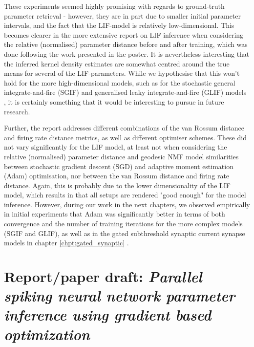 \documentclass[mphil,deptreport,ianc]{infthesis} %
\begin{document}
These experiments seemed highly promising with regards to ground-truth parameter retrieval - however, they are in part due to smaller initial parameter intervals, and the fact that the LIF-model is relatively low-dimensional.
This becomes clearer in the more extensive report on LIF inference when considering the relative (normalised) parameter distance before and after training, which was done following the work presented in the poster.
It is nevertheless interesting that the inferred kernel density estimates are somewhat centred around the true means for several of the LIF-parameters.
While we hypothesise that this won't hold for the more high-dimensional models, such as for the stochastic general integrate-and-fire (SGIF) \cite{Rene2020} and generalised leaky integrate-and-fire (GLIF) models \cite{allen_glif_white_paper}, it is certainly something that it would be interesting to pursue in future research.

Further, the report addresses different combinations of the van Rossum distance and firing rate distance metrics, as well as different optimiser schemes.
These did not vary significantly for the LIF model, at least not when considering the relative (normalised) parameter distance and geodesic NMF model similarities between stochastic gradient descent (SGD) and adaptive moment estimation (Adam) optimisation, nor between the van Rossum distance and firing rate distance.
Again, this is probably due to the lower dimensionality of the LIF model, which results in that all setups are rendered "good enough" for the model inference.
However, during our work in the next chapters, we observed empirically in initial experiments that Adam was significantly better in terms of both convergence and the number of training iterations for the more complex models (SGIF and GLIF), as well as in the gated subthreshold synaptic current synapse models in chapter \ref{chpt:gated_synaptic} \cite{Huh2017}.



\section{Report/paper draft: \textit{Parallel spiking neural network parameter inference using gradient based optimization}}



\end{document}

